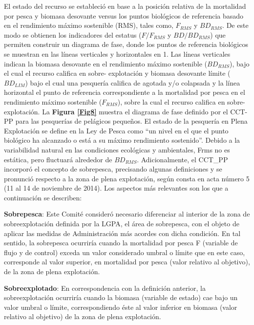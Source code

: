 \documentclass[
  spanish,
]{article}
\begin{document}
\quad

El estado del recurso se estableció en base a la posición relativa de la
mortalidad por pesca y biomasa desovante versus los puntos biológicos de
referencia basado en el rendimiento máximo sostenible (RMS), tales como,
\(F_{RMS}\) y \(BD_{RMS}\). De este modo se obtienen los indicadores del
estatus (\(F/F_{RMS}\) y \(BD/BD_{RMS}\)) que permiten construir un
diagrama de fase, donde los puntos de referencia biológicos se muestran
en las líneas verticales y horizontales en 1. Las líneas verticales
indican la biomasa desovante en el rendimiento máximo sostenible
(\(BD_{RMS}\)), bajo el cual el recurso califica en sobre- explotación y
biomasa desovante límite (\(BD_{LIM}\)) bajo el cual una pesquería
califica de agotada y/o colapsada y la línea horizontal el punto de
referencia correspondiente a la mortalidad por pesca en el rendimiento
máximo sostenible (\(F_{RMS}\)), sobre la cual el recurso califica en
sobre-explotación. La \textbf{Figura \ref{Fig8}} muestra el diagrama de
fase definido por el CCT-PP para las pesquerías de pelágicos pequeños.
El estado de la pesquería en Plena Explotación se define en la Ley de
Pesca como ``un nivel en el que el punto biológico ha alcanzado o está a
su máximo rendimiento sostenido''. Debido a la variabilidad natural en
las condiciones ecológicas y ambientales, Frms no es estática, pero
fluctuará alrededor de \(BD_{RMS}\). Adicionalmente, el CCT\_PP
incorporó el concepto de sobrepesca, precisando algunas definiciones y
se pronunció respecto a la zona de plena explotación, según consta en
acta número 5 (11 al 14 de noviembre de 2014). Los aspectos más
relevantes son los que a continuación se describen:

\vspace{0.5cm}

\textbf{Sobrepesca}: Este Comité consideró necesario diferenciar al
interior de la zona de sobreexplotación definida por la LGPA, el área de
sobrepesca, con el objeto de aplicar las medidas de Administración más
acordes con dicha condición. En tal sentido, la sobrepesca ocurriría
cuando la mortalidad por pesca F (variable de flujo y de control) exceda
un valor considerado umbral o límite que en este caso, corresponde al
valor superior, en mortalidad por pesca (valor relativo al objetivo), de
la zona de plena explotación.

\textbf{Sobreexplotado}: En correspondencia con la definición anterior,
la sobreexplotación ocurriría cuando la biomasa (variable de estado) cae
bajo un valor umbral o límite, correspondiendo éste al valor inferior en
biomasa (valor relativo al objetivo) de la zona de plena explotación.
\end{document}
